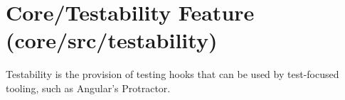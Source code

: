 \section{Core/Testability Feature (core/src/testability)}

Testability is the provision of testing hooks that can be used by test-focused tooling,
such as Angular’s Protractor.




